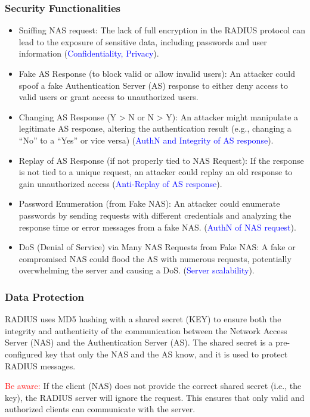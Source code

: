 \subsubsection{Security Functionalities}
\begin{itemize}
    \item Sniffing NAS request: The lack of full encryption in the RADIUS protocol can lead to the exposure of sensitive data, including passwords and user information (\textcolor{Blue}{Confidentiality, Privacy}).
    \item Fake AS Response (to block valid or allow invalid users): An attacker could spoof a fake Authentication Server (AS) response to either deny access to valid users or grant access to unauthorized users.
    \item Changing AS Response (Y > N or N > Y): An attacker might manipulate a legitimate AS response, altering the authentication result (e.g., changing a “No” to a “Yes” or vice versa) (\textcolor{Blue}{AuthN and Integrity of AS response}).
    \item Replay of AS Response (if not properly tied to NAS Request): If the response is not tied to a unique request, an attacker could replay an old response to gain unauthorized access (\textcolor{Blue}{Anti-Replay of AS response}).
    \item Password Enumeration (from Fake NAS): An attacker could enumerate passwords by sending requests with different credentials and analyzing the response time or error messages from a fake NAS. (\textcolor{Blue}{AuthN of NAS request}).
    \item DoS (Denial of Service) via Many NAS Requests from Fake NAS: A fake or compromised NAS could flood the AS with numerous requests, potentially overwhelming the server and causing a DoS. (\textcolor{Blue}{Server scalability}).
\end{itemize}

\subsubsection{Data Protection}
RADIUS uses MD5 hashing with a shared secret (KEY) to ensure both the integrity and authenticity of the communication between the Network Access Server (NAS) and the Authentication Server (AS). The shared secret is a pre-configured key that only the NAS and the AS know, and it is used to protect RADIUS messages.

\hfill

\textcolor{red}{Be aware:} If the client (NAS) does not provide the correct shared secret (i.e., the key), the RADIUS server will ignore the request. This ensures that only valid and authorized clients can communicate with the server.

